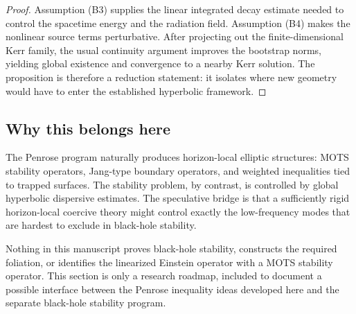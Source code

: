 \begin{proof}
Assumption (B3) supplies the linear integrated decay estimate needed to control the spacetime energy and the radiation field. Assumption (B4) makes the nonlinear source terms perturbative. After projecting out the finite-dimensional Kerr family, the usual continuity argument improves the bootstrap norms, yielding global existence and convergence to a nearby Kerr solution. The proposition is therefore a reduction statement: it isolates where new geometry would have to enter the established hyperbolic framework.
\end{proof}

\subsection{Why this belongs here}

The Penrose program naturally produces horizon-local elliptic structures: MOTS stability operators, Jang-type boundary operators, and weighted inequalities tied to trapped surfaces. The stability problem, by contrast, is controlled by global hyperbolic dispersive estimates. The speculative bridge is that a sufficiently rigid horizon-local coercive theory might control exactly the low-frequency modes that are hardest to exclude in black-hole stability.

\begin{remark}
Nothing in this manuscript proves black-hole stability, constructs the required foliation, or identifies the linearized Einstein operator with a MOTS stability operator. This section is only a research roadmap, included to document a possible interface between the Penrose inequality ideas developed here and the separate black-hole stability program.
\end{remark}


